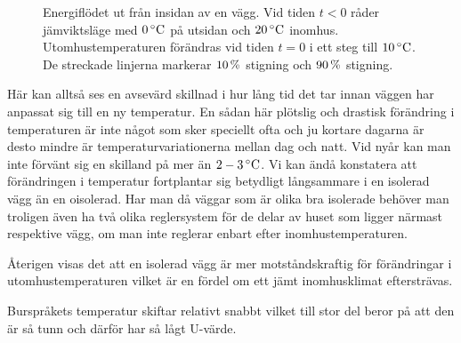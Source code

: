 \begin{figure}[hpbt]
\centering
{}\vspace{5mm}

\caption{\label{fig:energyflow_trans} Energiflödet ut från insidan av en vägg. Vid tiden $t<0$ råder jämviktsläge med $\unit[0]{^\circ C}$ på utsidan och $\unit[20]{^\circ C}$ inomhus. Utomhustemperaturen förändras vid tiden $t=0$ i ett steg till $\unit[10]{^\circ C}$. De streckade linjerna markerar $\unit[10]{\%}$ stigning och $\unit[90]{\%}$ stigning.}

\end{figure}

Här kan alltså ses en avsevärd skillnad i hur lång tid det tar innan väggen har anpassat sig till en ny temperatur. En sådan här plötslig och drastisk förändring i temperaturen är inte något som sker speciellt ofta och ju kortare dagarna är desto mindre är temperaturvariationerna mellan dag och natt. \cite{SMHItempskillnad}
Vid nyår kan man inte förvänt sig en skilland på mer än $\unit[2-3]{^\circ C}$. Vi kan ändå konstatera att förändringen i temperatur fortplantar sig betydligt långsammare i en isolerad vägg än en oisolerad. Har man då väggar som är olika bra isolerade behöver man troligen även ha två olika reglersystem för de delar av huset som ligger närmast respektive vägg, om man inte reglerar enbart efter inomhustemperaturen. 

Återigen visas det att en isolerad vägg är mer motståndskraftig för förändringar i utomhustemperaturen vilket är en fördel om ett jämt inomhusklimat eftersträvas.

Burspråkets temperatur skiftar relativt snabbt vilket till stor del beror på att den är så tunn och därför har så lågt U-värde.